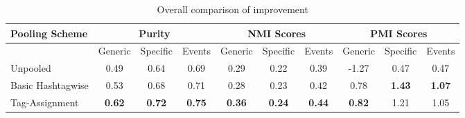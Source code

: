 \documentclass[10pt,a5paper,twoside]{article}
\begin{document}
\begin{table}[!h]
\setcounter{table}{13}
\centering
\resizebox{14cm}{!} 
{
	\begin{tabular}{|l|ccc|ccc|ccc|}
	\hline
	Pooling Scheme  & \multicolumn {3}{c}{Purity} & \multicolumn {3}{c}{NMI Scores} & \multicolumn {3}{c|}{PMI Scores}\\
	\hline
	 & Generic & Specific & Events &  Generic & Specific & Events &  Generic & Specific & Events\\
	\hline
	Unpooled & 0.49 & 0.64 & 0.69 & 0.29 & 0.22 & 0.39 & -1.27 & 0.47 & 0.47 \\
	\hline
	Basic Hashtagwise & 0.53 & 0.68 & 0.71 & 0.28 & 0.23 & 0.42 & 0.78 & \textbf{1.43} & \textbf{1.07} \\
	\hline
	Tag-Assignment & \textbf{0.62} & \textbf{0.72} & \textbf{0.75} & \textbf{0.36} & \textbf{0.24} & \textbf{0.44} & \textbf{0.82} & 1.21 & 1.05 \\
	\hline
	\end{tabular}
}
\caption{Overall comparison of improvement}\label{Table}
\end{table}
\end{document}
